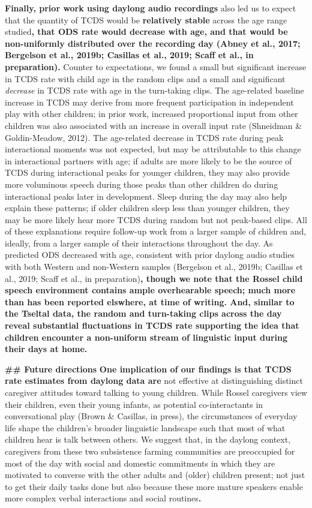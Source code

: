 \documentclass[,man,floatsintext]{apa6}
\begin{document}
\textbf{Finally, prior work using daylong audio recordings} also led us
to expect that the quantity of TCDS would be \textbf{relatively stable}
across the age range studied\textbf{, that ODS rate would decrease with
age, and that would be non-uniformly distributed over the recording day
(Abney et al., 2017; Bergelson et al., 2019b; Casillas et al., 2019;
Scaff et al., in preparation). }Counter to expectations, we found a
small but significant increase in TCDS rate with child age in the random
clips and a small and significant \emph{decrease} in TCDS rate with age
in the turn-taking clips. The age-related baseline increase in TCDS may
derive from more frequent participation in independent play with other
children; in prior work, increased proportional input from other
children was also associated with an increase in overall input rate
(Shneidman \& Goldin-Meadow, 2012). The age-related decrease in TCDS
rate during peak interactional moments was not expected, but may be
attributable to this change in interactional partners with age; if
adults are more likely to be the source of TCDS during interactional
peaks for younger children, they may also provide more voluminous speech
during those peaks than other children do during interactional peaks
later in development. Sleep during the day may also help explain these
patterns; if older children sleep less than younger children, they may
be more likely hear more TCDS during random but not peak-based clips.
All of these explanations require follow-up work from a larger sample of
children and, ideally, from a larger sample of their interactions
throughout the day. As predicted ODS decreased with age, consistent with
prior daylong audio studies with both Western and non-Western samples
(Bergelson et al., 2019b; Casillas et al., 2019; Scaff et al., in
preparation)\textbf{, though we note that the Rossel child speech
environment contains ample overhearable speech; much more than has been
reported elswhere, at time of writing. And, similar to the Tseltal data,
the random and turn-taking clips across the day reveal substantial
fluctuations in TCDS rate supporting the idea that children encounter a
non-uniform stream of linguistic input during their days at home.}

\textbf{\#\# Future directions} \textbf{One implication of our findings
is that TCDS rate estimates from daylong data are }not effective at
distinguishing distinct caregiver attitudes toward talking to young
children. While Rossel caregivers view their children, even their young
infants, as potential co-interactants in conversational play (Brown \&
Casillas, in press), the circumstances of everyday life shape the
children's broader linguistic landscape such that most of what children
hear is talk between others. We suggest that, in the daylong context,
caregivers from these two subsistence farming communities are
preoccupied for most of the day with social and domestic commitments in
which they are motivated to converse with the other adults and (older)
children present; not just to get their daily tasks done but also
because these more mature speakers enable more complex verbal
interactions and social routines\textbf{.}
\end{document}
